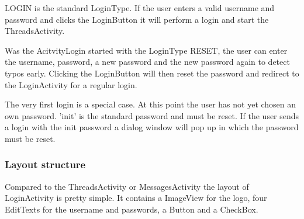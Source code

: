 \documentclass[12pt,a4paper,oneside]{report}
\begin{document}
LOGIN is the standard LoginType. If the user enters a valid username and password and clicks the LoginButton it will perform a login and start the ThreadsActivity. 

Was the AcitvityLogin started with the LoginType RESET, the user can enter the username, password, a new password and the new password again to detect typos early. Clicking the LoginButton will then reset the password and redirect to the LoginActivity for a regular login. 

The very first login is a special case. At this point the user has not yet chosen an own password. 'init' is the standard password and must be reset. If the user sends a login with the init password a dialog window will pop up in which the password must be reset. 

\subsubsection{Layout structure}
Compared to the ThreadsActivity or MessagesActivity the layout of LoginActivity is pretty simple. It contains a ImageView for the logo, four EditTexts for the username and passwords, a Button and a CheckBox.
\end{document}
